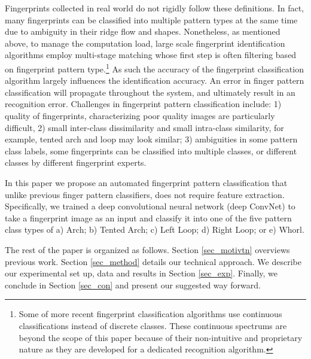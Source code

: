 Fingerprints collected in real world do not rigidly follow these definitions.
In fact, many fingerprints can be classified into multiple pattern types at the same time due to ambiguity in their ridge flow and shapes.
Nonetheless, as mentioned above, to manage the computation load, large scale fingerprint identification algorithms employ multi-stage matching whose first step is often filtering based on fingerprint pattern type.\footnote{Some of more recent fingerprint classification algorithms use continuous classifications instead of discrete classes. These continuous spectrums are beyond the scope of this paper because of their non-intuitive and proprietary nature as they are developed for a dedicated recognition algorithm.} As such the accuracy of the fingerprint classification algorithm largely influences the identification accuracy. An error in finger pattern classification will propagate throughout the system, and ultimately result in an recognition error. 
Challenges in fingerprint pattern classification include: 
%
1) quality of fingerprints, characterizing poor quality images are particularly difficult,
%
2) small inter-class dissimilarity and small intra-class similarity, for example, tented arch and loop may look similar; 
%
3) ambiguities in some pattern class labels, some fingerprints can be classified into multiple classes, or different classes by different fingerprint experts.

In this paper we propose an automated fingerprint pattern classification that unlike previous finger pattern classifiers, does not require feature extraction.  Specifically, we trained a deep convolutional neural network (deep ConvNet)  to take a fingerprint image as an input and classify it into one of the five pattern class types of a) Arch; b) Tented Arch; c) Left Loop; d) Right Loop; or e) Whorl. 

The rest of the paper is organized as follows.  Section \ref{sec_motivtn} overviews previous work. 
Section \ref{sec_method} details our technical approach. 
We describe our experimental set up, data and results in Section \ref{sec_exp}.
Finally, we conclude in Section \ref{sec_con} and present our suggested way forward.


